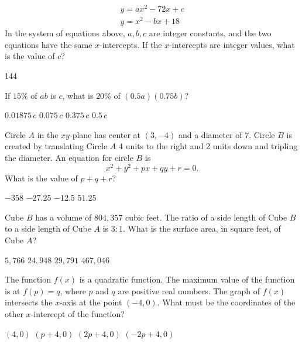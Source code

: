 \question[1]
\[
\begin{gathered}
y = a x^2 - 72x + c \\
y = x^2 - b x + 18
\end{gathered}
\]
In the system of equations above, $a,b,c$ are integer constants, and the two equations have the same $x$-intercepts. If the $x$-intercepts are integer values, what is the value of $c$?
\begin{solution}
144
\end{solution}






\newpage




\question[1]
If $15\%$ of $ab$ is $c$, what is $20\%$ of $(0.5a)(0.75b)$?
\begin{choices}
  \choice $0.01875\,c$
  \choice $0.075\,c$
  \choice $0.375\,c$
  \CorrectChoice $0.5\,c$
\end{choices}

\question[1]
Circle $A$ in the $xy$-plane has center at $(3,-4)$ and a diameter of $7$. Circle $B$ is created by translating Circle $A$ 4 units to the right and 2 units down and tripling the diameter. An equation for circle $B$ is
\[
x^2+y^2+p x+q y+r=0.
\]
What is the value of $p+q+r$?
\begin{choices}
  \choice $-358$
  \CorrectChoice $-27.25$
  \choice $-12.5$
  \choice $51.25$
\end{choices}

\question[1]
Cube $B$ has a volume of $804{,}357$ cubic feet. The ratio of a side length of Cube $B$ to a side length of Cube $A$ is $3:1$. What is the surface area, in square feet, of Cube $A$?
\begin{choices}
  \CorrectChoice $5{,}766$
  \choice $24{,}948$
  \choice $29{,}791$
  \choice $467{,}046$
\end{choices}






\newpage




\question[1]
The function $f(x)$ is a quadratic function. The maximum value of the function is at $f(p)=q$, where $p$ and $q$ are positive real numbers. The graph of $f(x)$ intersects the $x$-axis at the point $(-4,0)$. What must be the coordinates of the other $x$-intercept of the function?
\begin{choices}
  \choice $(4,0)$
  \choice $(p+4,0)$
  \CorrectChoice $(2p+4,0)$
  \choice $(-2p+4,0)$
\end{choices}

